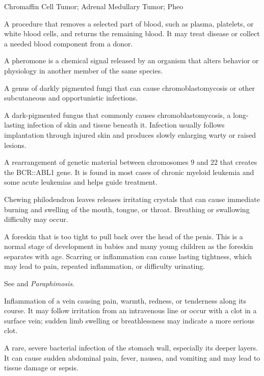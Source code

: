 \synonyms
Chromaffin Cell Tumor; Adrenal Medullary Tumor; Pheo

 A procedure that removes a selected part of blood, such as plasma, platelets, or white blood cells, and returns the remaining blood. It may treat disease or collect a needed blood component from a donor.

 A pheromone is a chemical signal released by an organism that alters behavior or physiology in another member of the same species.

 A genus of darkly pigmented fungi that can cause chromoblastomycosis or other subcutaneous and opportunistic infections.

 A dark-pigmented fungus that commonly causes chromoblastomycosis, a long-lasting infection of skin and tissue beneath it. Infection usually follows implantation through injured skin and produces slowly enlarging warty or raised lesions.

 A rearrangement of genetic material between chromosomes 9 and 22 that creates the BCR::ABL1 gene. It is found in most cases of chronic myeloid leukemia and some acute leukemias and helps guide treatment.

 Chewing philodendron leaves releases irritating crystals that can cause immediate burning and swelling of the mouth, tongue, or throat. Breathing or swallowing difficulty may occur.

 A foreskin that is too tight to pull back over the head of the penis. This is a normal stage of development in babies and many young children as the foreskin separates with age. Scarring or inflammation can cause lasting tightness, which may lead to pain, repeated inflammation, or difficulty urinating.

 See  and \textit{Paraphimosis}.

 Inflammation of a vein causing pain, warmth, redness, or tenderness along its course. It may follow irritation from an intravenous line or occur with a clot in a surface vein; sudden limb swelling or breathlessness may indicate a more serious clot.

 A rare, severe bacterial infection of the stomach wall, especially its deeper layers. It can cause sudden abdominal pain, fever, nausea, and vomiting and may lead to tissue damage or sepsis.

